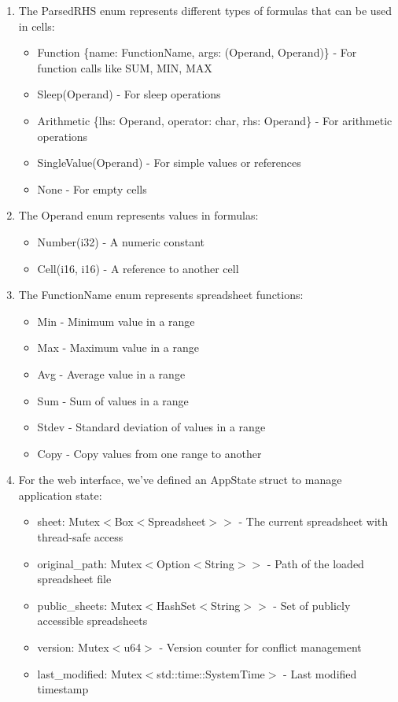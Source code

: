 \documentclass[10pt,a4paper]{article}  %
\begin{document}
\begin{enumerate}
\item The ParsedRHS enum represents different types of formulas that can be used in cells:
\begin{itemize}
    \item Function \{name: FunctionName, args: (Operand, Operand)\} - For function calls like SUM, MIN, MAX
    \item Sleep(Operand) - For sleep operations
    \item Arithmetic \{lhs: Operand, operator: char, rhs: Operand\} - For arithmetic operations
    \item SingleValue(Operand) - For simple values or references
    \item None - For empty cells
\end{itemize}

\item The Operand enum represents values in formulas:
\begin{itemize}
    \item Number(i32) - A numeric constant
    \item Cell(i16, i16) - A reference to another cell
\end{itemize}

\item The FunctionName enum represents spreadsheet functions:
\begin{itemize}
    \item Min - Minimum value in a range
    \item Max - Maximum value in a range
    \item Avg - Average value in a range
    \item Sum - Sum of values in a range
    \item Stdev - Standard deviation of values in a range
    \item Copy - Copy values from one range to another
\end{itemize}

\item For the web interface, we've defined an AppState struct to manage application state:
\begin{itemize}
    \item sheet: Mutex$<$Box$<$Spreadsheet$>$$>$ - The current spreadsheet with thread-safe access
    \item original\_path: Mutex$<$Option$<$String$>$$>$ - Path of the loaded spreadsheet file
    \item public\_sheets: Mutex$<$HashSet$<$String$>$$>$ - Set of publicly accessible spreadsheets
    \item version: Mutex$<$u64$>$ - Version counter for conflict management
    \item last\_modified: Mutex$<$std::time::SystemTime$>$ - Last modified timestamp
\end{itemize}


\end{enumerate}
\end{document}
